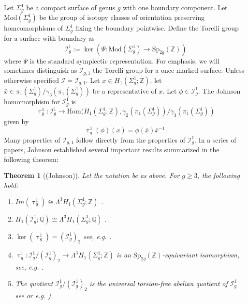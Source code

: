 \documentclass[a4paper]{amsproc}
\theoremstyle{TheoremNum}
\theoremstyle{Theorembold}
\newtheorem{thm}{Theorem}[section]
\theoremstyle{TheoremboldDef}
\theoremstyle{TheoremboldRem}
\theoremstyle{TheoremboldRem}
\begin{document}
 Let ${\Sigma_{g}^1}$ be a compact surface of genus $g$ with one boundary component. Let ${\text{Mod}(\Sigma_{g}^1)}$ be the group of isotopy classes of orientation preserving homeomorphisms of ${\Sigma_{g}^1}$ fixing the boundary pointwise. Define the Torelli group for a surface with boundary as \[{{\mathcal{I}}_{g}^{1}}:=\ker(\Psi:{\text{Mod}(\Sigma_{g}^1)}\to{\text{Sp}_{2g}({\mathbb{Z}})})\] where $\Psi$ is the standard symplectic representation. For emphasis, we will sometimes distinguish as ${{\mathcal{I}}_{g,1}}$ the Torelli group for a once marked surface. Unless otherwise specified ${\mathcal{I}}={{\mathcal{I}}_{g,1}}$.
 Let $x\in H_1({\Sigma_{g}^1};{\mathbb{Z}})$, let $\bar{x}\in{\pi_1}({\Sigma_{g}^1})/\gamma_3({\pi_1}({\Sigma_{g}^1}))$ be a representative of $x$. Let $\phi\in{{\mathcal{I}}_{g}^{1}}$. The Johnson homomorphism for ${\mathcal{I}}_g^1$ is
 \[\uptau_g^1:{{\mathcal{I}}_{g}^{1}}\to \text{Hom}(H_1({\Sigma_{g}^1};{\mathbb{Z}}),\gamma_2({\pi_1}({\Sigma_{g}^1}))/\gamma_3({\pi_1}({\Sigma_{g}^1}))\]
 given by  
\[\uptau_g^1(\phi)(x)=\phi(\bar{x})\bar{x}^{-1}.\]
Many properties of ${{\mathcal{I}}_{g,1}}$ follow directly from the properties of ${{\mathcal{I}}_{g}^{1}}$. In a series of papers, Johnson established several important results summarized in the following theorem:
\begin{thm}[(Johnson)]\label{johnson} Let the notation be as above. For $g{\geqslant} 3$, the following hold: \begin{enumerate}[label=\Alph*.]
\item $Im(\uptau_g^1)\cong\Lambda^3H_1({\Sigma_{g}^1};{\mathbb{Z}})$  \cite{johnsonsurvey}. 
\item $H_1({{\mathcal{I}}_{g}^{1}};{\mathbb{Q}})\cong\Lambda^3H_1({\Sigma_{g}^1};{\mathbb{Q}})$ \cite{johnsonstructure1, johnsonstructure3, johnsonsurvey}.
\item  $\ker(\uptau_g^1)=({{\mathcal{I}}_{g}^{1}})_2$ see, e.g. \cite[Th.6.18]{primer}.
\item  $\uptau_g^1:{{\mathcal{I}}_{g}^{1}}/({{\mathcal{I}}_{g}^{1}})_2\to\Lambda^3H_1({\Sigma_{g}^1};{\mathbb{Z}})$ is an ${\text{Sp}_{2g}({\mathbb{Z}})}$-equivariant isomorphism, see, e.g. \cite[Eq.6.1]{primer}.
\item The quotient ${{\mathcal{I}}_{g}^{1}}/({{\mathcal{I}}_{g}^{1}})_2$ is the universal torsion-free abelian quotient of ${{\mathcal{I}}_{g}^{1}}$ see \cite{johnsonsurvey, abelianquotient} or e.g. \cite[Sect.6.6.3]{primer}).
\end{enumerate}
 \end{thm}
\end{document}
